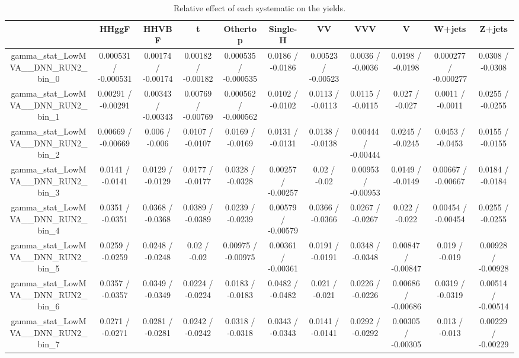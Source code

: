 \documentclass[10pt]{article}
\begin{document}
\begin{table}[htbp]
\begin{center}
\begin{tabular}{|c|c|c|c|c|c|c|c|c|c|c|}
\hline 
      & HHggF      & HHVBF      & t      & Othertop      & Single-H      & VV      & VVV      & V      & W+jets      & Z+jets \\ 
\hline 
  gamma_stat_LowMVA__DNN_RUN2_bin_0 & 0.000531 / -0.000531 & 0.00174 / -0.00174 & 0.00182 / -0.00182 & 0.000535 / -0.000535 & 0.0186 / -0.0186 & 0.00523 / -0.00523 & 0.0036 / -0.0036 & 0.0198 / -0.0198 & 0.000277 / -0.000277 & 0.0308 / -0.0308 \\ 
  gamma_stat_LowMVA__DNN_RUN2_bin_1 & 0.00291 / -0.00291 & 0.00343 / -0.00343 & 0.00769 / -0.00769 & 0.000562 / -0.000562 & 0.0102 / -0.0102 & 0.0113 / -0.0113 & 0.0115 / -0.0115 & 0.027 / -0.027 & 0.0011 / -0.0011 & 0.0255 / -0.0255 \\ 
  gamma_stat_LowMVA__DNN_RUN2_bin_2 & 0.00669 / -0.00669 & 0.006 / -0.006 & 0.0107 / -0.0107 & 0.0169 / -0.0169 & 0.0131 / -0.0131 & 0.0138 / -0.0138 & 0.00444 / -0.00444 & 0.0245 / -0.0245 & 0.0453 / -0.0453 & 0.0155 / -0.0155 \\ 
  gamma_stat_LowMVA__DNN_RUN2_bin_3 & 0.0141 / -0.0141 & 0.0129 / -0.0129 & 0.0177 / -0.0177 & 0.0328 / -0.0328 & 0.00257 / -0.00257 & 0.02 / -0.02 & 0.00953 / -0.00953 & 0.0149 / -0.0149 & 0.00667 / -0.00667 & 0.0184 / -0.0184 \\ 
  gamma_stat_LowMVA__DNN_RUN2_bin_4 & 0.0351 / -0.0351 & 0.0368 / -0.0368 & 0.0389 / -0.0389 & 0.0239 / -0.0239 & 0.00579 / -0.00579 & 0.0366 / -0.0366 & 0.0267 / -0.0267 & 0.022 / -0.022 & 0.00454 / -0.00454 & 0.0255 / -0.0255 \\ 
  gamma_stat_LowMVA__DNN_RUN2_bin_5 & 0.0259 / -0.0259 & 0.0248 / -0.0248 & 0.02 / -0.02 & 0.00975 / -0.00975 & 0.00361 / -0.00361 & 0.0191 / -0.0191 & 0.0348 / -0.0348 & 0.00847 / -0.00847 & 0.019 / -0.019 & 0.00928 / -0.00928 \\ 
  gamma_stat_LowMVA__DNN_RUN2_bin_6 & 0.0357 / -0.0357 & 0.0349 / -0.0349 & 0.0224 / -0.0224 & 0.0183 / -0.0183 & 0.0482 / -0.0482 & 0.021 / -0.021 & 0.0226 / -0.0226 & 0.00686 / -0.00686 & 0.0319 / -0.0319 & 0.00514 / -0.00514 \\ 
  gamma_stat_LowMVA__DNN_RUN2_bin_7 & 0.0271 / -0.0271 & 0.0281 / -0.0281 & 0.0242 / -0.0242 & 0.0318 / -0.0318 & 0.0343 / -0.0343 & 0.0141 / -0.0141 & 0.0292 / -0.0292 & 0.00305 / -0.00305 & 0.013 / -0.013 & 0.00229 / -0.00229 \\ 
\hline 
\end{tabular} 
\caption{Relative effect of each systematic on the yields.} 
\end{center} 
\end{table} 
\end{document}
